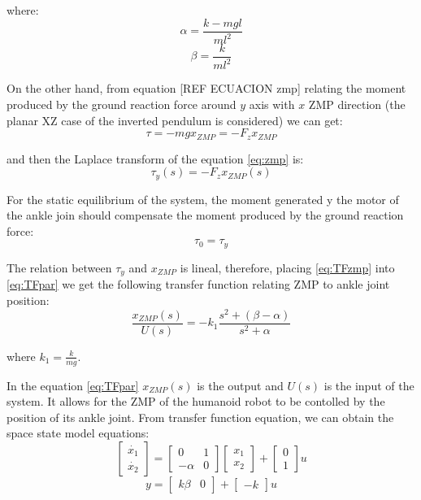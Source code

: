where:
\begin{equation}
\alpha = \frac{k-mgl}{ml^2}
\end{equation}
\begin{equation}
\beta = \frac{k}{ml^2}
\end{equation}

On the other hand, from equation [REF ECUACION zmp] relating the moment produced by the ground reaction force around $y$ axis with $x$ ZMP direction (the planar XZ case of the inverted pendulum is considered) we can get:
\begin{equation}
\tau = -mgx_{ZMP} = - F_z x_{ZMP}
\label{eq:zmp}
\end{equation} 

and then the Laplace transform of the equation \ref{eq:zmp} is:
\begin{equation}
\tau_y(s) = - F_z x_{ZMP}(s)
\label{eq:TFzmp}
\end{equation}

For the static equilibrium of the system, the moment generated y the motor of the ankle join should compensate the moment produced by the ground reaction force:
\begin{equation}
\tau_0 = \tau_y
\end{equation}

The relation between $\tau_y$ and $x_{ZMP}$ is lineal, therefore, placing \ref{eq:TFzmp} into \ref{eq:TFpar} we get the following transfer function relating ZMP to ankle joint position: 
\begin{equation}
\frac{x_{ZMP}(s)}{U(s)} = - k_1 \frac{s^2+(\beta - \alpha)}{s^2 + \alpha}
\end{equation}

where $k_1 = \frac{k}{mg}$.

In the equation \ref{eq:TFpar} $x_{ZMP}(s)$ is the output and $U(s)$ is the input of the system. It allows for the ZMP of the humanoid robot to be contolled by the position of its ankle joint. From transfer function equation, we can obtain the space state model equations:
\begin{equation}
\begin{bmatrix}
\dot{x_1} \\
\dot{x_2}
\end{bmatrix} 
= 
\begin{bmatrix}
0 & 1 \\
-\alpha & 0
\end{bmatrix}
\begin{bmatrix}
x_1 \\
x_2
\end{bmatrix}
+
\begin{bmatrix}
0 \\
1
\end{bmatrix}
u
\end{equation}
\begin{equation}
y = \begin{bmatrix}
k\beta & 0 
\end{bmatrix}
+ \begin{bmatrix}
-k
\end{bmatrix}
u
\end{equation}

